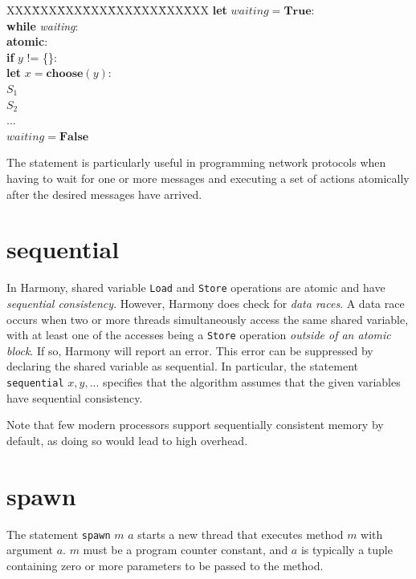 \documentclass{report}
\newenvironment{code}{
\tcolorbox
}{
\endtcolorbox
}
\begin{document}
\begin{code}
\begin{tabbing}
XXX\=XXX\=XXX\=XXX\=XXX\=XXX\=XXX\=XXX\kill
\>\textbf{let} $\mathit{waiting} = \mathbf{True}:$ \\
\>\>\textbf{while} \textit{waiting}: \\
\>\>\>\textbf{atomic}: \\
\>\>\>\>\textbf{if} $y$ != \{\}:\\
\>\>\>\>\>\textbf{let} $x = \mathbf{choose}(y)$:\\
\>\>\>\>\>\>$S_1$ \\
\>\>\>\>\>\>$S_2$ \\
\>\>\>\>\>\>$...$ \\
\>\>\>\>\>$\mathit{waiting} = \mathbf{False}$
\end{tabbing}
\end{code}

The statement is particularly useful in programming network protocols
when having to wait for one or more messages and executing a set
of actions atomically after the desired messages have arrived.

\section{\textbf{sequential}}

In Harmony, shared variable \texttt{Load} and \texttt{Store} operations
are atomic and have \emph{sequential consistency}.
However, Harmony does check for \emph{data races}.  A data race occurs
when two or more threads simultaneously access the same shared variable,
with at least one of the accesses being a \texttt{Store} operation
\emph{outside of an atomic block}.
If so, Harmony will report an error.  This error can be suppressed by
declaring the shared variable as sequential.  In particular, the statement
\texttt{sequential} $x, y, ...$ specifies that the algorithm assumes
that the given variables have sequential consistency.

Note that few modern processors support sequentially consistent memory
by default, as doing so would lead to high overhead.

\section{\textbf{spawn}}

The statement \texttt{spawn} $m$ $a$ starts a new thread that executes
method $m$ with argument $a$. $m$ must be a program counter constant,
and $a$ is typically a tuple containing
zero or more parameters to be passed to the method.
\end{document}
